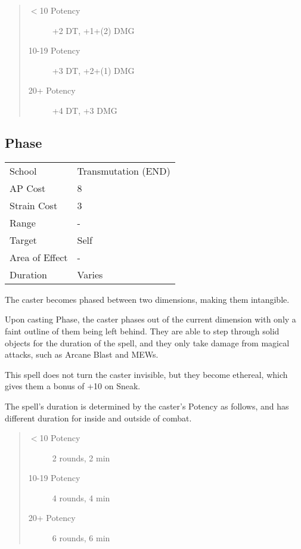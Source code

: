 \documentclass[11pt,a4paper,twocolumn]{book}
\begin{document}
\begin{quote}
	\begin{description}
		\item[$<$10 Potency] 	+2 DT, +1+(2) DMG
		\item[10-19 Potency] 	+3 DT, +2+(1) DMG
		\item[20+ Potency] 		+4 DT, +3 DMG
	\end{description}	
\end{quote}


\subsection*{Phase}
{
	\begin{tabu} to 75mm{| X[l,4] | X[l,7] |}
		\hline
		School         & Transmutation (END) \\
		AP Cost        & 8                   \\
		Strain Cost    & 3                   \\
		Range          & -         \\
		Target         & Self            \\
		Area of Effect & -                   \\
		Duration       & Varies              \\ \hline
	\end{tabu}
	
}

\medskip

The caster becomes phased between two dimensions, making them intangible.

Upon casting Phase, the caster phases out of the current dimension with only a faint outline of them being left behind. They are able to step through solid objects for the duration of the spell, and they only take damage from magical attacks, such as Arcane Blast and MEWs.

This spell does not turn the caster invisible, but they become ethereal, which gives them a bonus of +10 on Sneak.

The spell's duration is determined by the caster's Potency as follows, and has different duration for inside and outside of combat.

\begin{quote}
	\begin{description}
		\item[$<$10 Potency] 	2 rounds, 2 min
		\item[10-19 Potency] 	4 rounds, 4 min
		\item[20+ Potency] 		6 rounds, 6 min
	\end{description}	
\end{quote}
\end{document}
